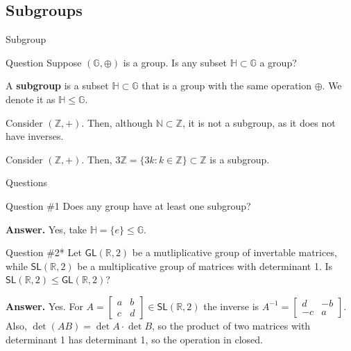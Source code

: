 \documentclass{beamer}
\begin{document}
    \subsection{Subgroups}
    \begin{frame}{Subgroup}

      \begin{alertblock}{Question}
          Suppose $(\mathbb{G}, \oplus)$ is a group. Is any subset $\mathbb{H} \subset \mathbb{G}$ a group?\pause
      \end{alertblock}

      \begin{definition}
          A \textbf{subgroup} is a subset $\mathbb{H} \subset \mathbb{G}$ that is a group with the same operation $\oplus$. We denote it as $\mathbb{H} \leq \mathbb{G}$.\pause
      \end{definition}

      \begin{example}
          Consider $(\mathbb{Z}, +)$. Then, although $\mathbb{N} \subset \mathbb{Z}$, it is not a subgroup, as it does not have inverses.\pause
      \end{example}

      \begin{example}
          Consider $(\mathbb{Z}, +)$. Then, $3\mathbb{Z} = \{3k: k \in \mathbb{Z}\} \subset \mathbb{Z}$ is a subgroup.
      \end{example}
  \end{frame}

  \begin{frame}{Questions}
    \begin{alertblock}{Question \#1}
      Does any group have at least one subgroup?\pause
    \end{alertblock}

    \textbf{Answer.} Yes, take $\mathbb{H} = \{e\} \leq \mathbb{G}$.\pause

    \begin{alertblock}{Question \#2*}
      Let $\mathsf{GL}(\mathbb{R},2)$ be a mutliplicative group of invertable matrices, while $\mathsf{SL}(\mathbb{R},2)$ be a multiplicative group of matrices with determinant 1. Is $\mathsf{SL}(\mathbb{R},2) \leq \mathsf{GL}(\mathbb{R},2)$?\pause
    \end{alertblock}

    \textbf{Answer.} Yes. For $A = \begin{bmatrix}
      a & b \\
      c & d
    \end{bmatrix} \in \mathsf{SL}(\mathbb{R},2)$ the inverse is $A^{-1} = \begin{bmatrix}
      d & -b \\ -c & a
    \end{bmatrix}$. Also, $\det (AB) = \det A \cdot \det B$, so the product of two matrices with determinant 1 has determinant 1, so the operation in closed.
  \end{frame}
\end{document}
